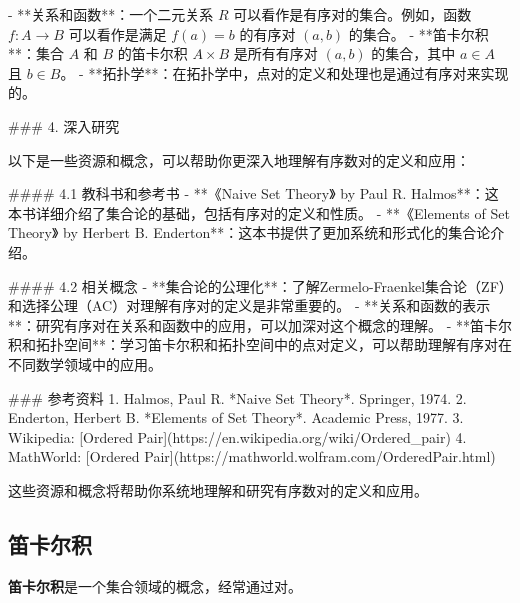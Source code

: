 - **关系和函数**：一个二元关系 \(R\) 可以看作是有序对的集合。例如，函数 \(f : A \to B\) 可以看作是满足 \(f(a) = b\) 的有序对 \((a, b)\) 的集合。
- **笛卡尔积**：集合 \(A\) 和 \(B\) 的笛卡尔积 \(A \times B\) 是所有有序对 \((a, b)\) 的集合，其中 \(a \in A\) 且 \(b \in B\)。
- **拓扑学**：在拓扑学中，点对的定义和处理也是通过有序对来实现的。

### 4. 深入研究

以下是一些资源和概念，可以帮助你更深入地理解有序数对的定义和应用：

#### 4.1 教科书和参考书
- **《Naive Set Theory》 by Paul R. Halmos**：这本书详细介绍了集合论的基础，包括有序对的定义和性质。
- **《Elements of Set Theory》 by Herbert B. Enderton**：这本书提供了更加系统和形式化的集合论介绍。

#### 4.2 相关概念
- **集合论的公理化**：了解Zermelo-Fraenkel集合论（ZF）和选择公理（AC）对理解有序对的定义是非常重要的。
- **关系和函数的表示**：研究有序对在关系和函数中的应用，可以加深对这个概念的理解。
- **笛卡尔积和拓扑空间**：学习笛卡尔积和拓扑空间中的点对定义，可以帮助理解有序对在不同数学领域中的应用。

### 参考资料
1. Halmos, Paul R. *Naive Set Theory*. Springer, 1974.
2. Enderton, Herbert B. *Elements of Set Theory*. Academic Press, 1977.
3. Wikipedia: [Ordered Pair](https://en.wikipedia.org/wiki/Ordered_pair)
4. MathWorld: [Ordered Pair](https://mathworld.wolfram.com/OrderedPair.html)

这些资源和概念将帮助你系统地理解和研究有序数对的定义和应用。
\subsection{笛卡尔积}

\textbf{笛卡尔积}是一个集合领域的概念，经常通过对。

